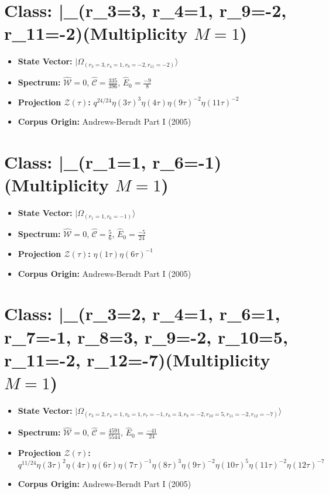 \documentclass[11pt,twoside,openright]{book}
\begin{document}
\section*{Class: |\Omega_{(r_{3}=3, r_{4}=1, r_{9}=-2, r_{11}=-2)}\rangle (Multiplicity $M=1$)}
\begin{itemize}
  \item \textbf{State Vector:} $|\Omega_{(r_{3}=3, r_{4}=1, r_{9}=-2, r_{11}=-2)}\rangle$
  \item \textbf{Spectrum:} $\hat{\mathcal{W}} = 0$, $\hat{\mathcal{C}} = \frac{335}{396}$, $\hat{E}_0 = \frac{-9}{8}$
  \item \textbf{Projection $\mathcal{Z}(\tau)$:} $q^{24/24} \eta(3\tau)^{3} \eta(4\tau) \eta(9\tau)^{-2} \eta(11\tau)^{-2}$
  \item \textbf{Corpus Origin:} Andrews-Berndt Part I (2005)
\end{itemize}

\section*{Class: |\Omega_{(r_{1}=1, r_{6}=-1)}\rangle (Multiplicity $M=1$)}
\begin{itemize}
  \item \textbf{State Vector:} $|\Omega_{(r_{1}=1, r_{6}=-1)}\rangle$
  \item \textbf{Spectrum:} $\hat{\mathcal{W}} = 0$, $\hat{\mathcal{C}} = \frac{5}{6}$, $\hat{E}_0 = \frac{-5}{24}$
  \item \textbf{Projection $\mathcal{Z}(\tau)$:} $\eta(1\tau) \eta(6\tau)^{-1}$
  \item \textbf{Corpus Origin:} Andrews-Berndt Part I (2005)
\end{itemize}

\section*{Class: |\Omega_{(r_{3}=2, r_{4}=1, r_{6}=1, r_{7}=-1, r_{8}=3, r_{9}=-2, r_{10}=5, r_{11}=-2, r_{12}=-7)}\rangle (Multiplicity $M=1$)}
\begin{itemize}
  \item \textbf{State Vector:} $|\Omega_{(r_{3}=2, r_{4}=1, r_{6}=1, r_{7}=-1, r_{8}=3, r_{9}=-2, r_{10}=5, r_{11}=-2, r_{12}=-7)}\rangle$
  \item \textbf{Spectrum:} $\hat{\mathcal{W}} = 0$, $\hat{\mathcal{C}} = \frac{4591}{5544}$, $\hat{E}_0 = \frac{-41}{24}$
  \item \textbf{Projection $\mathcal{Z}(\tau)$:} $q^{11/24} \eta(3\tau)^{2} \eta(4\tau) \eta(6\tau) \eta(7\tau)^{-1} \eta(8\tau)^{3} \eta(9\tau)^{-2} \eta(10\tau)^{5} \eta(11\tau)^{-2} \eta(12\tau)^{-7}$
  \item \textbf{Corpus Origin:} Andrews-Berndt Part I (2005)
\end{itemize}
\end{document}
